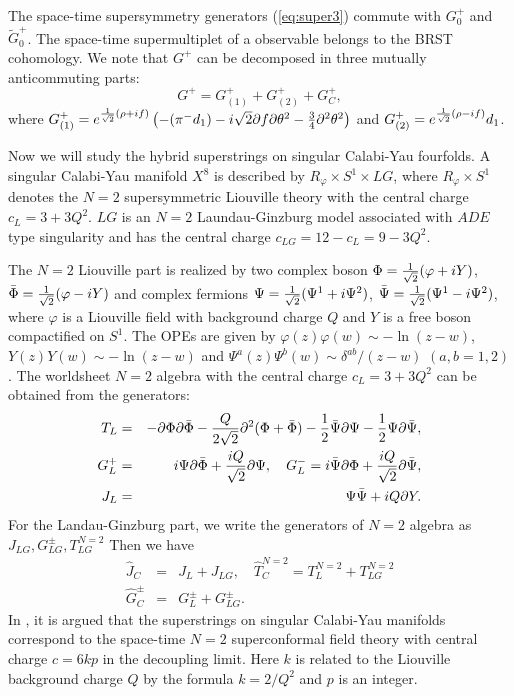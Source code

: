 \documentclass[a4paper,12pt]{article}
\begin{document}
The space-time supersymmetry generators (\ref{eq:super3}) commute with 
$G^{+}_{0}$ and $\tilde{G}^{+}_{0}$.
The space-time supermultiplet of a observable 
belongs to the BRST cohomology. 
We note that $G^{+}$ can be decomposed in three mutually anticommuting
parts:
\begin{equation}
G^{+}=G^{+}_{(1)}+G^{+}_{(2)}+G^{+}_{C},
\label{eq:brs1}
\end{equation}
where $G^{+}_{(1)}=e^{{1\over\sqrt{2}}(\rho+i f)} 
\left(-(\pi^{-}d_{1})-i\sqrt{2}\partial f \partial \theta^{2}
-{3\over4}\partial^{2}\theta^2\right)$  and
$G^{+}_{(2)}= e^{{1\over\sqrt{2}}(\rho-i f)}d_{1}$.

Now we will study the hybrid superstrings on 
singular Calabi-Yau fourfolds.
A singular Calabi-Yau manifold $X^{8}$ is described by 
$R_{\varphi}\times S^{1}\times LG$\cite{GKP},
where $R_{\varphi}\times S^{1}$ denotes the $N=2$ supersymmetric 
Liouville theory with the central charge $c_{L}=3+3Q^2$.
$LG$ is an $N=2$ Laundau-Ginzburg model associated with 
$ADE$ type singularity and has the central charge $c_{LG}=12-c_{L}=9-3Q^2$.

The $N=2$ Liouville part 
is realized by two complex boson
$\Phi={1\over\sqrt{2}}(\varphi+i Y)$,
$\bar{\Phi}={1\over\sqrt{2}}(\varphi-i Y)$
and complex fermions
$\Psi={1\over\sqrt{2}}(\Psi^{1}+ i\Psi^{2})$,
$\bar{\Psi}={1\over\sqrt{2}}(\Psi^{1}- i\Psi^{2})$,
where $\varphi$ is a Liouville field with background charge $Q$ 
and $Y$ is a free boson compactified on $S^1$.
The OPEs are given by
$\varphi(z)\varphi(w)\sim -\ln(z-w)$, $Y(z)Y(w)\sim -\ln (z-w)$
and $\Psi^{a}(z)\Psi^{b}(w)\sim \delta^{ab}/(z-w)$ $(a,b=1,2)$.
The worldsheet $N=2$ algebra with the central charge $c_{L}=3+3Q^2$ 
can be obtained from the generators:
\begin{eqnarray}
 T_{L}&=&-\partial\Phi\partial\bar{\Phi}
-{Q\over2\sqrt{2}}\partial^2(\Phi+\bar{\Phi}) 
-{1\over2} \bar{\Psi}\partial\Psi
-{1\over2} \Psi\partial\bar{\Psi},\nonumber\\
G^{+}_{L}&=&i\Psi\partial \bar{\Phi}
+{i Q\over\sqrt{2}}\partial \Psi,
\quad
G^{-}_{L}=i\bar{\Psi}\partial \Phi
+{i Q\over\sqrt{2}}\partial \bar{\Psi},
\nonumber\\
J_{L}&=&\Psi\bar{\Psi}+iQ\partial Y.
\end{eqnarray}
For the Landau-Ginzburg part, we write the generators of $N=2$ algebra as
$J_{LG},G^{\pm}_{LG}, T^{N=2}_{LG}$
Then we have
\begin{eqnarray}
\widehat{J}_{C}&=& J_{L}+J_{LG},\quad 
\widehat{T}^{N=2}_{C}=T^{N=2}_{L}+T^{N=2}_{LG}\nonumber\\
\widehat{G}^{\pm}_{C}&=& G^{\pm}_{L}+G^{\pm}_{LG}.
\end{eqnarray}
In \cite{GKP}, it is argued that the superstrings on singular
Calabi-Yau manifolds
correspond to the space-time $N=2$  superconformal
field theory with central charge $c=6kp$ in the decoupling limit.
Here $k$ is related to the Liouville background charge $Q$ by the 
formula $k=2/Q^2$ and $p$ is an integer.
\end{document}
